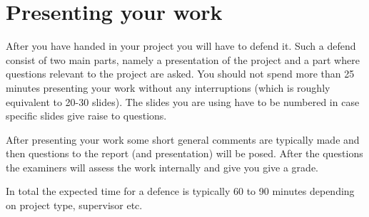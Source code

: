 \chapter{Presenting your work}

After you have handed in your project you will have to defend it. Such a defend consist of two main parts, namely a presentation of the project and a part where questions relevant to the project are asked. You should not spend more than 25 minutes presenting your work without any interruptions (which is roughly equivalent to 20-30 slides). The slides you are using have to be numbered in case specific slides give raise to questions.

After presenting your work some short general comments are typically made and then questions to the report (and presentation) will be posed. After the questions the examiners will assess the work internally and give you give a grade.

In total the expected time for a defence is typically 60 to 90 minutes depending on project type, supervisor etc.
